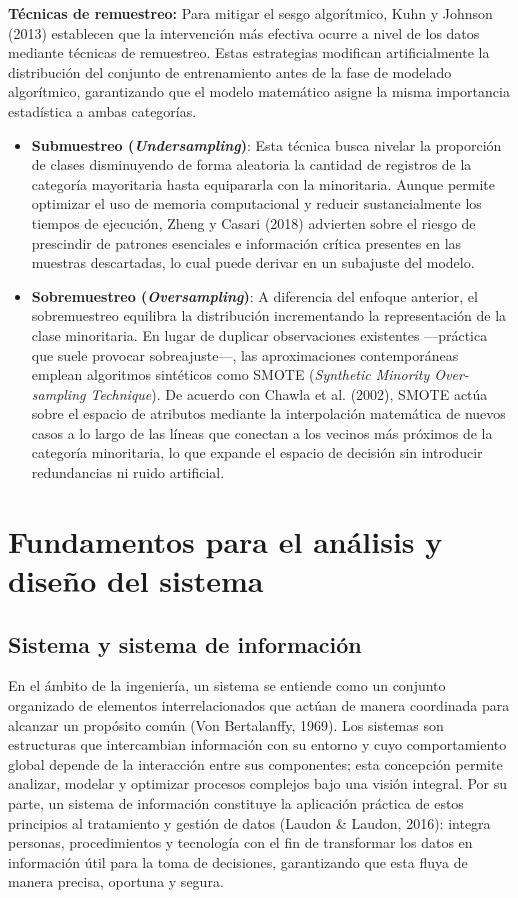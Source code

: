 \documentclass[11pt,oneside,openany]{book}
\begin{document}
\textbf{Técnicas de remuestreo:} Para mitigar el sesgo algorítmico, Kuhn y Johnson (2013) establecen que la intervención más efectiva ocurre a nivel de los datos mediante técnicas de remuestreo. Estas estrategias modifican artificialmente la distribución del conjunto de entrenamiento antes de la fase de modelado algorítmico, garantizando que el modelo matemático asigne la misma importancia estadística a ambas categorías.

\begin{itemize}[leftmargin=*]
\item \textbf{Submuestreo (\emph{Undersampling})}: Esta técnica busca nivelar la proporción de clases disminuyendo de forma aleatoria la cantidad de registros de la categoría mayoritaria hasta equipararla con la minoritaria. Aunque permite optimizar el uso de memoria computacional y reducir sustancialmente los tiempos de ejecución, Zheng y Casari (2018) advierten sobre el riesgo de prescindir de patrones esenciales e información crítica presentes en las muestras descartadas, lo cual puede derivar en un subajuste del modelo.
\item \textbf{Sobremuestreo (\emph{Oversampling})}: A diferencia del enfoque anterior, el sobremuestreo equilibra la distribución incrementando la representación de la clase minoritaria. En lugar de duplicar observaciones existentes ---práctica que suele provocar sobreajuste---, las aproximaciones contemporáneas emplean algoritmos sintéticos como SMOTE (\emph{Synthetic Minority Over-sampling Technique}). De acuerdo con Chawla et al. (2002), SMOTE actúa sobre el espacio de atributos mediante la interpolación matemática de nuevos casos a lo largo de las líneas que conectan a los vecinos más próximos de la categoría minoritaria, lo que expande el espacio de decisión sin introducir redundancias ni ruido artificial.
\end{itemize}
\section{Fundamentos para el análisis y diseño del sistema}

\subsection{Sistema y sistema de información}

En el ámbito de la ingeniería, un sistema se entiende como un conjunto organizado de elementos interrelacionados que actúan de manera coordinada para alcanzar un propósito común (Von Bertalanffy, 1969). Los sistemas son estructuras que intercambian información con su entorno y cuyo comportamiento global depende de la interacción entre sus componentes; esta concepción permite analizar, modelar y optimizar procesos complejos bajo una visión integral. Por su parte, un sistema de información constituye la aplicación práctica de estos principios al tratamiento y gestión de datos (Laudon \& Laudon, 2016): integra personas, procedimientos y tecnología con el fin de transformar los datos en información útil para la toma de decisiones, garantizando que esta fluya de manera precisa, oportuna y segura.
\end{document}
